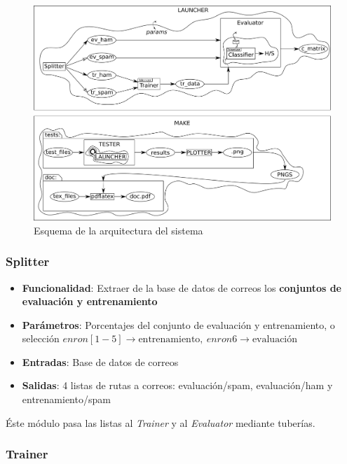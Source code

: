 \begin{landscape}
\begin{figure}[p]
	\centering
	\includegraphics[width=\paperwidth, height=\paperheight, keepaspectratio]{img/esquema}
	\caption{Esquema de la arquitectura del sistema}
	\label{fig:esquema}
\end{figure}
\end{landscape}

\subsubsection{Splitter}

\begin{itemize}
	\item \textbf{Funcionalidad}: Extraer de la base de datos de correos los
		\textbf{conjuntos de evaluación y entrenamiento}
	\item \textbf{Parámetros}: Porcentajes del conjunto de evaluación y
		entrenamiento, o selección $enron[1-5] \rightarrow
		\text{entrenamiento},\ enron6 \rightarrow \text{evaluación}$
	\item \textbf{Entradas}: Base de datos de correos
	\item \textbf{Salidas}: 4 listas de rutas a correos: evaluación/spam,
		evaluación/ham y entrenamiento/spam
\end{itemize}

Éste módulo pasa las listas al \textit{Trainer} y al \textit{Evaluator} mediante
tuberías.

\subsubsection{Trainer}

